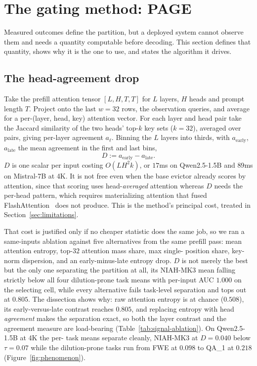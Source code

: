 \documentclass{article}
\newcommand{\method}{PAGE\xspace}
\begin{document}
\section{The gating method: \method}
\label{sec:method}

Measured outcomes define the partition, but a deployed system cannot observe
them and needs a quantity computable before decoding. This section defines
that quantity, shows why it is the one to use, and states the algorithm it
drives.

\subsection{The head-agreement drop}
\label{subsec:signal}

Take the prefill attention tensor $[L, H, T, T]$ for $L$ layers, $H$ heads and
prompt length $T$. Project onto the last $w = 32$ rows, the observation
queries, and average for a per-(layer, head, key) attention vector. For each
layer and head pair take the Jaccard similarity of the two heads' top-$k$ key
sets ($k = 32$), averaged over pairs, giving per-layer agreement $a_\ell$.
Binning the $L$ layers into thirds, with $a_{\text{early}}$, $a_{\text{late}}$
the mean agreement in the first and last bins,
\begin{equation}
\label{eq:D}
D := a_{\text{early}} - a_{\text{late}}.
\end{equation}
$D$ is one scalar per input costing $O(L H^2 k)$, or $17$ms on Qwen2.5-1.5B
and $89$ms on Mistral-7B at 4K. It is not free even when the base evictor
already scores by attention, since that scoring uses head-\emph{averaged}
attention whereas $D$ needs the per-head pattern, which requires materializing
attention that fused FlashAttention~\citep{flash-attention} does not produce.
This is the method's principal cost, treated in Section~\ref{sec:limitations}.

That cost is justified only if no cheaper statistic does the same job, so we
ran a same-inputs ablation against five alternatives from the same prefill
pass: mean attention entropy, top-$32$ attention mass share, max single-
position share, key-norm dispersion, and an early-minus-late entropy drop. $D$
is not merely the best but the only one separating the partition at all, its
NIAH-MK3 mean falling strictly below all four dilution-prone task means with
per-input AUC $1.000$ on the selecting cell, while every alternative fails
task-level separation and tops out at $0.805$. The dissection shows why: raw
attention entropy is at chance ($0.508$), its early-versus-late contrast
reaches $0.805$, and replacing entropy with head \emph{agreement} makes the
separation exact, so both the layer contrast and the agreement measure are
load-bearing (Table~\ref{tab:signal-ablation}). On Qwen2.5-1.5B at 4K the per-
task means separate cleanly, NIAH-MK3 at $D = 0.040$ below $\tau = 0.07$ while
the dilution-prone tasks run from FWE at $0.098$ to QA\_1 at $0.218$
(Figure~\ref{fig:phenomenon}).
\end{document}
